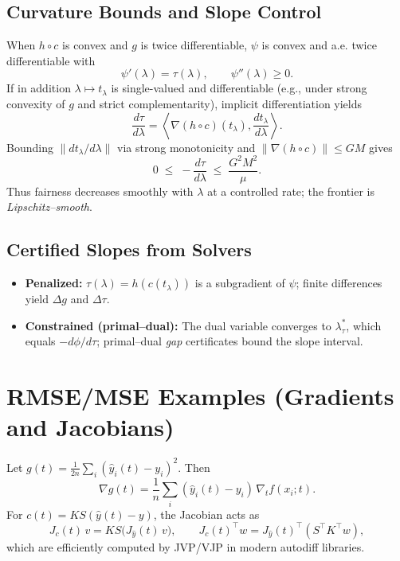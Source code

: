 \documentclass[11pt]{article}
\theoremstyle{plain}
\theoremstyle{definition}
\newcommand{\ip}[2]{\left\langle #1,#2 \right\rangle}
\newcommand{\1}{\mathbf{1}}
\begin{document}
\subsection{Curvature Bounds and Slope Control}
When $h\circ c$ is convex and $g$ is twice differentiable, $\psi$ is convex and a.e. twice differentiable with
\[
 \psi'(\lambda)=\tau(\lambda),\qquad \psi''(\lambda)\ge 0.
\]
If in addition $\lambda\mapsto t_\lambda$ is single-valued and differentiable (e.g., under strong convexity of $g$ and strict complementarity), implicit differentiation yields
\[
 \frac{d \tau}{d\lambda} 
 = \ip{\nabla (h\!\circ\! c)(t_\lambda)}{ \frac{dt_\lambda}{d\lambda} }.
\]
Bounding $\|dt_\lambda/d\lambda\|$ via strong monotonicity and $\|\nabla (h\!\circ\! c)\|\le GM$ gives
\[
 0 \;\le\; -\frac{d\tau}{d\lambda} \;\le\; \frac{G^2 M^2}{\mu}.
\]
Thus fairness decreases smoothly with $\lambda$ at a controlled rate; the frontier is \emph{Lipschitz--smooth}.

\subsection{Certified Slopes from Solvers}
\begin{itemize}[leftmargin=2em]
 \item \textbf{Penalized:} $\tau(\lambda)=h(c(t_\lambda))$ is a subgradient of $\psi$; finite differences yield $\Delta g$ and $\Delta \tau$.
 \item \textbf{Constrained (primal--dual):} The dual variable converges to $\lambda^*_\tau$, which equals $-d\phi/d\tau$; primal--dual \emph{gap} certificates bound the slope interval.
\end{itemize}

\section{RMSE/MSE Examples (Gradients and Jacobians)}
Let $g(t)=\frac{1}{2n}\sum_i (\hat y_i(t)-y_i)^2$. Then
\[
 \nabla g(t)=\frac{1}{n}\sum_i (\hat y_i(t)-y_i)\,\nabla_t f(x_i;t).
\]
For $c(t)=K S (\hat y(t)-y)$, the Jacobian acts as
\[
 J_c(t)\,v = K S \big(J_{\hat y}(t)\,v\big),\qquad
 J_c(t)^\top w = J_{\hat y}(t)^\top (S^\top K^\top w),
\]
which are efficiently computed by JVP/VJP in modern autodiff libraries.
\end{document}
